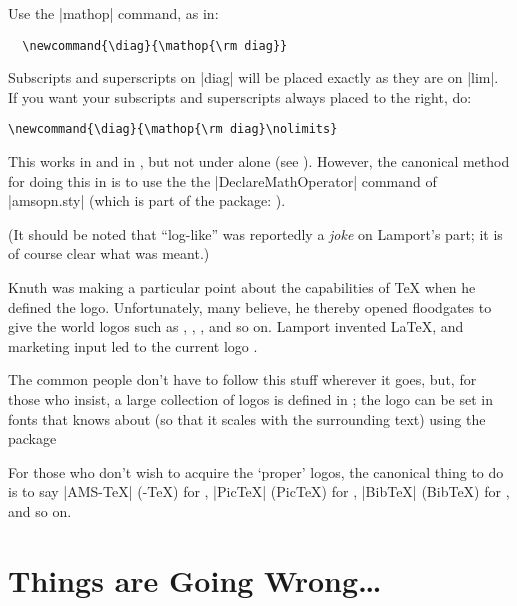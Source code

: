 \begin{changemargin}{-1cm}{-1cm}
Use the \cs|mathop| command, as in:
\begin{verbatim}
  \newcommand{\diag}{\mathop{\rm diag}}
\end{verbatim}

Subscripts and superscripts on \cs|diag| will be placed exactly as they
are on \cs|lim|.  If you want your subscripts and superscripts always
placed to the right, do:
\begin{verbatim}
\newcommand{\diag}{\mathop{\rm diag}\nolimits}
\end{verbatim}

This works in \LaTeXo{} and in \LaTeXe{}, but not under  alone
(see ).
However, the canonical method for doing this in \LaTeXe{} is to use
the the \cs|DeclareMathOperator| command of |amsopn.sty| (which is
part of the \AMSLaTeX{} package: ).

(It should be noted that ``log-like'' was reportedly a \emph{joke} on
Lamport's part; it is of course clear what was meant.)


Knuth was making a particular point about the capabilities of \TeX{}
when he defined the logo.  Unfortunately, many
believe, he thereby opened floodgates to
give the world logos such as \AMSTeX{}, \PiCTeX{}, \BibTeX{}, and so on.
Lamport invented \LaTeX{}, and marketing input led to
the current logo \LaTeXe{}.

The common people don't have to follow this stuff wherever it goes,
but, for those who insist, a large collection of logos is defined in
; the \MF{} logo can be set in fonts that \LaTeXe{}
knows about (so that it scales with the surrounding text) using the
package 

For those who don't wish to acquire the `proper' logos, the canonical
thing to do is to say |AMS-\TeX{}| (-\TeX{}) for \AMSTeX{},
|Pic\TeX{}| (Pic\TeX{}) for \PiCTeX{}, |Bib\TeX{}| (Bib\TeX{}) for
\BibTeX{}, and so on.


\section{Things are Going Wrong\dots{}}



\end{changemargin}
